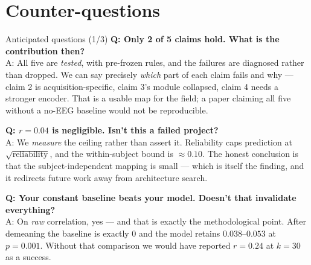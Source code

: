 \documentclass[aspectratio=169,11pt]{beamer}
\begin{document}
\section{Counter-questions}
\begin{frame}{Anticipated questions (1/3)}
\small
\textbf{Q: Only 2 of 5 claims hold. What is the contribution then?}\\
A: All five are \emph{tested}, with pre-frozen rules, and the failures
are diagnosed rather than dropped. We can say precisely \emph{which} part of each
claim fails and why --- claim 2 is acquisition-specific, claim 3's module
collapsed, claim 4 needs a stronger encoder. That is a usable map for the field;
a paper claiming all five without a no-EEG baseline would not be reproducible.

\vspace{0.5em}
\textbf{Q: $r=0.04$ is negligible. Isn't this a failed project?}\\
A: We \emph{measure} the ceiling rather than assert it. Reliability caps
prediction at $\sqrt{\text{reliability}}$, and the within-subject bound is
$\approx0.10$. The honest conclusion is that the subject-independent mapping is
small --- which is itself the finding, and it redirects future work away from
architecture search.

\vspace{0.5em}
\textbf{Q: Your constant baseline beats your model. Doesn't that invalidate everything?}\\
A: On \emph{raw} correlation, yes --- and that is exactly the methodological
point. After demeaning the baseline is exactly $0$ and the model retains
$0.038$--$0.053$ at $p=0.001$. Without that comparison we would have reported
$r=0.24$ at $k=30$ as a success.
\end{frame}
\end{document}
